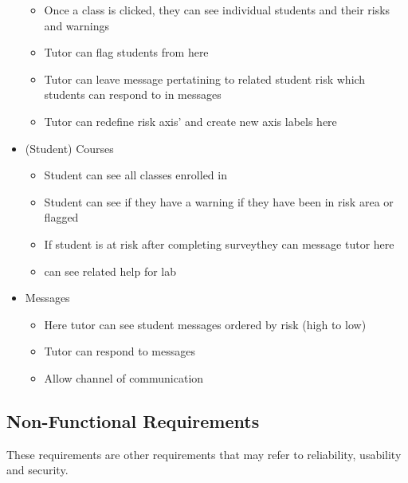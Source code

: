 \documentclass{l4proj}
\begin{document}
\begin{itemize}
\begin{itemize}
    \item Once a class is clicked, they can see individual students and their risks and warnings
    \item Tutor can flag students from here
    \item Tutor can leave message pertatining to related student risk which students can respond to in messages
    \item Tutor can redefine risk axis' and create new axis labels here
\end{itemize}
\item (Student) Courses
\begin{itemize}
    \item Student can see all classes enrolled in
    \item Student can see if they have a warning if they have been in risk area or flagged
    \item If student is at risk after completing surveythey can message tutor here
    \item can see related help for lab
\end{itemize}
\item Messages
\begin{itemize}
    \item Here tutor can see student messages ordered by risk (high to low)
    \item Tutor can respond to messages
    \item Allow channel of communication
\end{itemize}

\end{itemize}


\subsection{Non-Functional Requirements}
These requirements are other requirements that may refer to reliability, usability and security.
\end{document}
